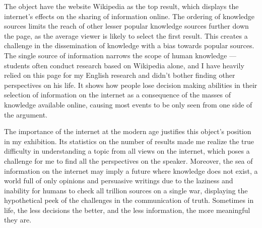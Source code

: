 \documentclass[a4paper,11pt]{article}
\begin{document}
The object have the website Wikipedia as the top result, which displays the internet's effects on the sharing of information online. The ordering of knowledge sources limits the reach of other lesser popular knowledge sources further down the page, as the average viewer is likely to select the first result. This creates a challenge in the dissemination of knowledge with a bias towards popular sources. The single source of information narrows the scope of human knowledge --- students often conduct research based on Wikipedia alone, and I have heavily relied on this page for my English research and didn't bother finding other perspectives on his life. It shows how people lose decision making abilities in their selection of information on the internet as a consequence of the masses of knowledge available online, causing most events to be only seen from one side of the argument.


The importance of the internet at the modern age justifies this object's position in my exhibition. Its statistics on the number of results made me realize the true difficulty in understanding a topic from all views on the internet, which poses a challenge for me to find all the perspectives on the speaker. Moreover, the sea of information on the internet may imply a future where knowledge does not exist, a world full of only opinions and persuasive writings due to the laziness and inability for humans to check all trillion sources on a single war, displaying the hypothetical peek of the challenges in the communication of truth. Sometimes in life, the less decisions the better, and the less information, the more meaningful they are.


\end{document}
